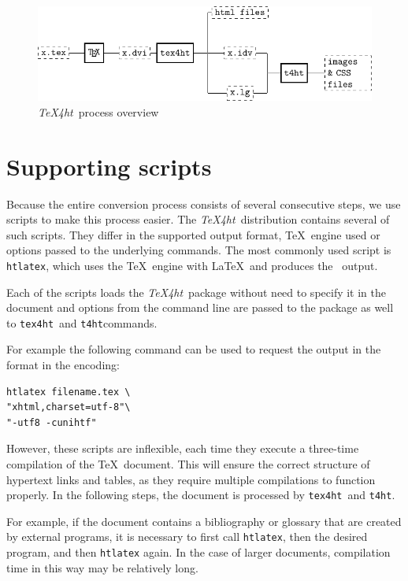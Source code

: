 \documentclass{ltugproc}
\newcommand\term[1]{\textit{#1}}
\newcommand\command[1]{\texttt{#1}}
\newcommand\texfourht{\term{\TeX4ht}}
\newcommand\texfourhtcmd{\command{tex4ht}}
\newcommand\tfourhtcmd{\command{t4ht}}
\begin{document}
\begin{figure}[hbt!]
  \includegraphics[width=\textwidth]{img/tex4ht_process.pdf}
\caption{\texfourht\ process overview}
\label{fig:overview}
\end{figure}

\section{Supporting scripts}

Because the entire conversion process consists of several consecutive steps,
we use scripts to make this process easier. The \texfourht\ distribution
contains several of such scripts. They differ in the supported output format, \TeX\ engine used 
or options passed to the underlying commands.
The most commonly used script  is \command{htlatex}, which uses the \PDF\TeX\ engine with
\LaTeX\ and produces the \HTML\ output. 

Each of the scripts loads the \texfourht\ package without need to specify it in
the document and options from the command line are passed to the package as well to
\texfourhtcmd\ and \tfourhtcmd commands.

For example the following command can be used to request the output in the
 format in the  encoding:

\begin{verbatim}
htlatex filename.tex \
"xhtml,charset=utf-8"\
"-utf8 -cunihtf"
\end{verbatim}

However, these scripts are inflexible, each time they execute a three-time
compilation of the \TeX\  document. This will ensure the correct structure of
hypertext links and tables, as they require multiple compilations to
function properly. In the following steps, the document is processed by
\texfourhtcmd\ and \tfourhtcmd. 

For example, if the document contains a bibliography or
glossary that are created by external programs, it is necessary to first call
\command{htlatex}, then the desired program, and then \command{htlatex} again.
In the case of larger documents, compilation time in this way may be relatively
long.
\end{document}
